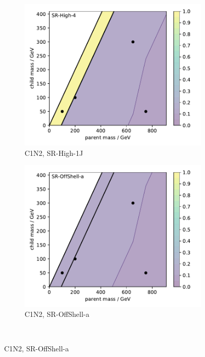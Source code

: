 \begin{figure}[tp]
\centering
\begin{subfigure}{0.48\textwidth}
\centering
\includegraphics[width=\textwidth]{figures/2ljets_signal_sys_c1n2_SRHigh4.pdf}
\caption{C1N2, SR-High-1J}
\end{subfigure}
\hfill
\begin{subfigure}{0.48\textwidth}
\centering
\includegraphics[width=\textwidth]{figures/2ljets_signal_sys_c1n2_SROffShell_1.pdf}
\caption{C1N2, SR-OffShell-a}
\end{subfigure}
\\[0.5em]

\end{figure}
